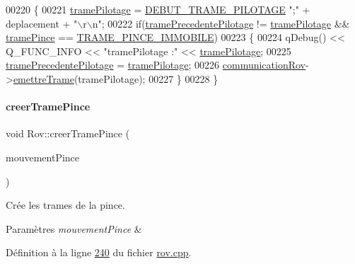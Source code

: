 \begin{DoxyCode}
00220 \{
00221     \hyperlink{class_rov_a379b288ce69a0bb9eaac8f673db8ae07}{tramePilotage} = \hyperlink{rov_8h_a023822fa9447e76b37e5d5c78f5c64f9}{DEBUT\_TRAME\_PILOTAGE} \textcolor{stringliteral}{";"} + deplacement + \textcolor{stringliteral}{"\(\backslash\)r\(\backslash\)n"};
00222     \textcolor{keywordflow}{if}(\hyperlink{class_rov_a12b08128a49ca43fc1198fdeb6a6f0cd}{tramePrecedentePilotage} != \hyperlink{class_rov_a379b288ce69a0bb9eaac8f673db8ae07}{tramePilotage} && 
      \hyperlink{class_rov_a2c24d7c884d8fae07e452105037f8e2c}{tramePince} == \hyperlink{rov_8h_ab46e52d96e193353eadd9cd7f598f670}{TRAME\_PINCE\_IMMOBILE})
00223     \{
00224         qDebug() << Q\_FUNC\_INFO << \textcolor{stringliteral}{"tramePilotage :"} << \hyperlink{class_rov_a379b288ce69a0bb9eaac8f673db8ae07}{tramePilotage};
00225         \hyperlink{class_rov_a12b08128a49ca43fc1198fdeb6a6f0cd}{tramePrecedentePilotage} = \hyperlink{class_rov_a379b288ce69a0bb9eaac8f673db8ae07}{tramePilotage};
00226         \hyperlink{class_rov_a8e7aaa17ee2134f26d57241d11ab2a99}{communicationRov}->\hyperlink{class_communication_rov_a4f52076db8d6e78abe1745fa1e235272}{emettreTrame}(tramePilotage);
00227     \}
00228 \}
\end{DoxyCode}
\mbox{\label{class_rov_a66be7f6ff6e20da160d55e0cd0605965}} 
\paragraph{\texorpdfstring{creer\+Trame\+Pince}{creerTramePince}}
{\footnotesize\ttfamily void Rov\+::creer\+Trame\+Pince (\begin{DoxyParamCaption}\item[{Q\+String}]{mouvement\+Pince }\end{DoxyParamCaption})\hspace{0.3cm}{\ttfamily [slot]}}



Crée les trames de la pince. 


\begin{DoxyParams}{Paramètres}
{\em mouvement\+Pince} & \\
\hline
\end{DoxyParams}


Définition à la ligne \hyperlink{rov_8cpp_source_l00240}{240} du fichier \hyperlink{rov_8cpp_source}{rov.\+cpp}.




